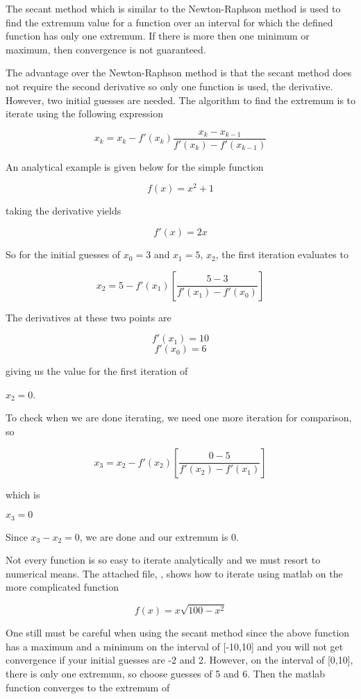 \documentclass[12pt]{article}
\begin{document}
The secant method which is similar to the Newton-Raphson method is used to find the extremum value for a function over an interval for which the defined function has only one extremum.  If there is more then one minimum or maximum, then convergence is not guaranteed.

The advantage over the Newton-Raphson method is that the secant method does not require the second derivative so only one function is used, the derivative.  However, two initial guesses are needed.  The algorithm to find the extremum is to iterate using the following expression 

$$ x_k = x_k - f'(x_k) \frac{x_k - x_{k-1}}{f'(x_k) - f'(x_{k-1})} $$

An analytical example is given below for the simple function

$$ f(x) = x^2 + 1 $$

taking the derivative yields

$$ f'(x) = 2x $$

So for the initial guesses of $x_0 = 3$ and $x_1 = 5$, $x_2$, the first iteration evaluates to

$$x_2 = 5 - f'(x_1) \left [ \frac{5 - 3}{f'(x_1) - f'(x_0)} \right ] $$

The derivatives at these two points are

$$ f'(x_1) = 10$$
$$ f'(x_0) = 6$$

giving us the value for the first iteration of 

$x_2 = 0$.

To check when we are done iterating, we need one more iteration for comparison, so

$$x_3 = x_2 - f'(x_2) \left [ \frac{0 - 5}{f'(x_2) - f'(x_1)} \right ] $$

which is

$x_3 = 0$

Since $x_3 - x_2 = 0$, we are done and our extremum is $0$.

Not every function is so easy to iterate analytically and we must resort to numerical means.  The attached file, , shows how to iterate using matlab on the more complicated function

$$ f(x) = x \sqrt{100 - x^2} $$

One still must be careful when using the secant method since the above function has a maximum and a minimum on the interval of [-10,10] and you will not get convergence if your initial guesses are -2 and 2.  However, on the interval of [0,10], there is only one extremum, so choose guesses of 5 and 6.  Then the matlab function converges to the extremum of
\end{document}
